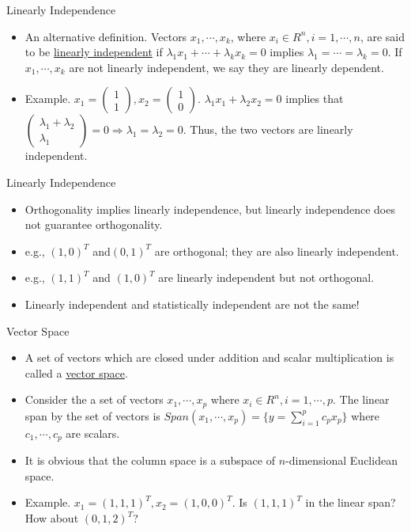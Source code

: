 \documentclass[landscape]{slides}
\begin{document}
\begin{slide}{\Large Linearly Independence}
\begin{itemize}
    \item An alternative definition. Vectors $x_1,\cdots,x_k$, where $x_i \in R^n, i=1,\cdots,n$, are said to be \underline{linearly independent} if $\lambda_1x_1+\cdots+\lambda_kx_k=0$ implies $\lambda_1=\cdots=\lambda_k=0$. If $x_1,\cdots,x_k$ are not linearly independent, we say they are linearly dependent.
    \item Example. $x_1=\begin{pmatrix}1 \\ 1 \end{pmatrix}, x_2=\begin{pmatrix}1 \\ 0 \end{pmatrix}$. 
    $\lambda_1x_1+\lambda_2x_2=0$ implies that $\begin{pmatrix}\lambda_1+\lambda_2 \\ \lambda_1\end{pmatrix}=0 \Rightarrow \lambda_1=\lambda_2=0$. Thus, the two vectors are linearly independent.
\end{itemize}
\end{slide}

\begin{slide}{\Large Linearly Independence}
\begin{itemize}
    \item Orthogonality implies linearly independence, but linearly independence does not guarantee orthogonality.
    \item e.g., $(1,0)^T$ and$(0,1)^T$ are orthogonal; they are also linearly independent.
    \item e.g., $(1,1)^T$ and $(1,0)^T$ are linearly independent but not orthogonal. 
    \item Linearly independent and statistically independent are not the same!
\end{itemize}
\end{slide}

\begin{slide}{\Large Vector Space}
\begin{itemize}
    \item A set of vectors which are closed under addition and scalar multiplication is called a \underline{vector space}.
    \item Consider the a set of vectors $x_1,\cdots, x_p$ where $x_i\in R^n, i=1,\cdots,p$. The linear span by the set of vectors is 
    $Span(x_1,\cdots,x_p)=\{y=\sum_{i=1}^p c_p x_p\}$
    where $c_1,\cdots,c_p$ are scalars. 
    \item It is obvious that the column space is a subspace of $n$-dimensional Euclidean space.
    \item Example. $x_1=(1,1,1)^T,x_2=(1,0,0)^T$. Is $(1,1,1)^T$ in the linear span? How about $(0,1,2)^T$?
\end{itemize}
\end{slide}  
\end{document}
